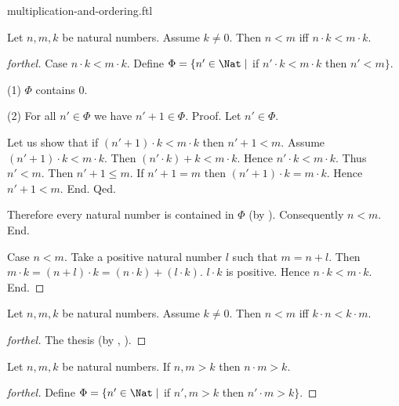 \documentclass{naproche-library}
\begin{document}
\begin{smodule}[title=Multiplication and Ordering]{multiplication-and-ordering.ftl}

\begin{proposition}[forthel,id=ARITHMETIC_06_8817333933965312]
  Let $n, m, k$ be natural numbers.
  Assume $k \neq 0$.
  Then $n < m$ iff $n \cdot k < m \cdot k$.
\end{proposition}
\begin{proof}[forthel]
  Case $n \cdot k < m \cdot k$.
    Define $\Phi = \{ n' \in \Nat \mid$ if $n' \cdot k < m \cdot k$ then $n' < m \}$.

    (1) $\Phi$ contains $0$.

    (2) For all $n' \in \Phi$ we have $n' + 1 \in \Phi$. \newline
    Proof.
      Let $n' \in \Phi$.

      Let us show that if $(n' + 1) \cdot k < m \cdot k$ then $n' + 1 < m$.
        Assume $(n' + 1) \cdot k < m \cdot k$.
        Then $(n' \cdot k) + k < m \cdot k$.
        Hence $n' \cdot k < m \cdot k$.
        Thus $n' < m$.
        Then $n' + 1 \leq m$.
        If $n' + 1 = m$ then $(n' + 1) \cdot k = m \cdot k$.
        Hence $n' + 1 < m$.
      End.
    Qed.

    Therefore every natural number is contained in $\Phi$ (by ).
    Consequently $n < m$.
  End.

  Case $n < m$.
    Take a positive natural number $l$ such that $m = n + l$.
    Then $m \cdot k = (n + l) \cdot k = (n \cdot k) + (l \cdot k)$.
    $l \cdot k$ is positive.
    Hence $n \cdot k < m \cdot k$.
  End.
\end{proof}

\begin{corollary}[forthel,id=ARITHMETIC_06_5048640368279552]
  Let $n, m, k$ be natural numbers.
  Assume $k \neq 0$.
  Then $n < m$ iff $k \cdot n < k \cdot m$.
\end{corollary}
\begin{proof}[forthel]
  The thesis (by , ).
\end{proof}

\begin{proposition}[forthel,id=ARITHMETIC_06_1826268599287808]
  Let $n, m, k$ be natural numbers.
  If $n, m > k$ then $n \cdot m > k$.
\end{proposition}
\begin{proof}[forthel]
  Define $\Phi = \{ n' \in \Nat \mid$ if $n', m > k$ then $n' \cdot m > k \}$.


\end{proof}
\end{smodule}
\end{document}
